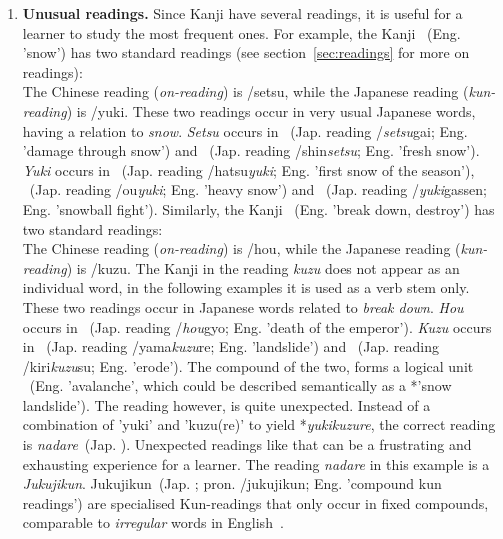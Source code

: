 \begin{enumerate}
  \item \textbf{Unusual readings.} Since Kanji have several readings, 
        it is useful for a learner to study the most frequent ones.
        For example, the Kanji ~(Eng. 'snow') has two 
        standard readings (see section~\ref{sec:readings} for more on 
        readings):\\
        The Chinese reading (\emph{on-reading}) is /setsu, 
        while the Japanese reading (\emph{kun-reading}) is /yuki.
        These two readings occur in very usual Japanese words, having a 
        relation to \emph{snow}. \emph{Setsu} occurs in
        ~(Jap. reading /\emph{setsu}gai; 
        Eng. 'damage through snow') and
        ~(Jap. reading /shin\emph{setsu}; 
        Eng. 'fresh snow').
        \emph{Yuki} occurs in
        ~(Jap. reading /hatsu\emph{yuki}; 
        Eng. 'first snow of the season'),
        ~(Jap. reading /ou\emph{yuki}; 
        Eng. 'heavy snow') and
        ~(Jap. reading /\emph{yuki}gassen; 
        Eng. 'snowball fight'). 
        Similarly, the Kanji ~(Eng. 'break down, destroy') 
        has two standard readings:\\
        The Chinese reading (\emph{on-reading}) is /hou, 
        while the Japanese reading (\emph{kun-reading}) is /kuzu.
        The Kanji  in the reading \emph{kuzu} does not appear as an 
        individual word, in the following examples it is used as a 
        verb stem only. These two readings occur in Japanese words related to 
        \emph{break down}. \emph{Hou} occurs in 
        ~(Jap. reading /\emph{hou}gyo; 
        Eng. 'death of the emperor').
        \emph{Kuzu} occurs in 
        ~(Jap. reading /yama\emph{kuzu}re; 
        Eng. 'landslide') and 
        ~(Jap. reading /kiri\emph{kuzu}su; 
        Eng. 'erode').
        The compound of the two, forms a logical unit 
        ~(Eng. 'avalanche', which could be described semantically as a 
        *'snow landslide'). The reading however, is quite unexpected. Instead of
        a combination of 'yuki' and 'kuzu(re)' to yield *\emph{yukikuzure},
        the correct reading is \emph{nadare}~(Jap. ).
        Unexpected readings like that can be a frustrating and exhausting 
        experience for a learner. %
        The reading \emph{nadare} in this example is a \emph{Jukujikun}.
        Jukujikun~(Jap. ; pron. /jukujikun; 
        Eng. 'compound kun readings') are specialised Kun-readings that only 
        occur in fixed compounds, comparable to \emph{irregular} words in 
        English~.
     

\end{enumerate}
